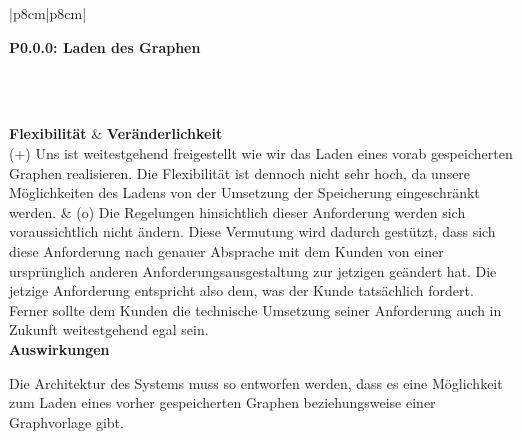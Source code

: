 \documentclass[enabledeprecatedfontcommands,fontsize=11pt,paper=a4,twoside]{scrartcl}
\newcounter{one}
\newcounter{two}[one]
\newcounter{three}[two]
\newcommand{\tone}{0\theone}
\newcommand{\ttwo}{0\thetwo}
\newcommand{\three}{\stepcounter{three}0\thethree}
\begin{document}
\begin{tabular} {|p{8cm}|p{8cm}|}
	\hline
	 {\parbox{16cm}{\textbf{\hypertarget{w}{P\tone.\ttwo.\three}: Laden des Graphen}} }\\ \hline \hline
	\rule{0pt}{5ex}\\ [2ex] \hline
	\textbf{Flexibilität}  & \textbf{Veränderlichkeit} \\
	(+) Uns ist weitestgehend freigestellt wie wir das Laden eines vorab gespeicherten Graphen realisieren. Die Flexibilität ist dennoch nicht sehr hoch, da unsere Möglichkeiten des Ladens von der Umsetzung der Speicherung eingeschränkt werden. &
	(o) Die Regelungen hinsichtlich dieser Anforderung werden sich voraussichtlich nicht ändern. Diese Vermutung wird dadurch gestützt, dass sich diese Anforderung nach genauer Absprache mit dem Kunden von einer ursprünglich anderen Anforderungsausgestaltung zur jetzigen geändert hat. Die jetzige Anforderung entspricht also dem, was der Kunde tatsächlich fordert. Ferner sollte dem Kunden die technische Umsetzung seiner Anforderung auch in Zukunft weitestgehend egal sein. \\ \hline
	 {\textbf{Auswirkungen}} \\
	 {\parbox{16cm}{Die Architektur des Systems muss so entworfen werden, dass es eine Möglichkeit zum Laden eines vorher gespeicherten Graphen beziehungsweise einer Graphvorlage gibt.} }\\ \hline
\end{tabular}
\\ \\ \\ \\ %
\end{document}
